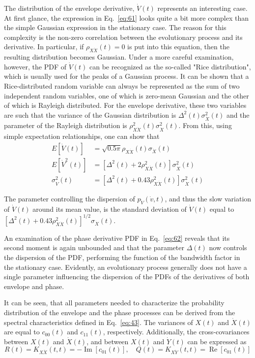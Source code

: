 \documentclass[12pt]{article}
\begin{document}
The distribution of the envelope derivative, $\dot{V}(t)$ represents an interesting case. At first glance, the expression in Eq.~\eqref{eq:61} looks quite a bit more complex than the simple Gaussian expression in the stationary case. The reason for this complexity is the non-zero correlation between the evolutionary process and its derivative. In particular, if $\rho_{X \dot{X}}(t)=0$ is put into this equation, then the resulting distribution becomes Gaussian. Under a more careful examination, however, the PDF of $\dot{V}(t)$ can be recognized as the so-called "Rice distribution", which is usually used for the peaks of a Gaussian process. It can be shown that a Rice-distributed random variable can always be represented as the sum of two independent random variables, one of which is zero-mean Gaussian and the other of which is Rayleigh distributed. For the envelope derivative, these two variables are such that the variance of the Gaussian distribution is $\Delta^{2}(t) \sigma_{\dot{X}}^{2}(t)$ and the parameter of the Rayleigh distribution is $\rho_{X \dot{X}}^{2}(t) \sigma_{\dot{X}}^{2}(t)$. From this, using simple expectation relationships, one can show that
\begin{align}
E[\dot{V}(t)] &=\sqrt{0.5 \pi} \rho_{X \dot{X}}(t) \sigma_{\dot{X}}(t) \nonumber \\
E\left[\dot{V}^{2}(t)\right] &=\left[\Delta^{2}(t)+2 \rho_{X \dot{X}}^{2}(t)\right] \sigma_{\dot{X}}^{2}(t) \nonumber \\
\sigma_{\dot{V}}^{2}(t) &=\left[\Delta^{2}(t)+0.43 \rho_{X \dot{X}}^{2}(t)\right] \sigma_{\dot{X}}^{2}(t)
\label{eq:65}
\end{align}

The parameter controlling the dispersion of $p_{\dot{V}}(\dot{v}, t)$, and thus the slow variation of $\dot{V}(t)$ around its mean value, is the standard deviation of $\dot{V}(t)$ equal to $\left[\Delta^{2}(t)+0.43 \rho_{X \dot{X}}^{2}(t)\right]^{1/2} \sigma_{\dot{X}}(t)$.

An examination of the phase derivative PDF in Eq.~\eqref{eq:62} reveals that its second moment is again unbounded and that the parameter $\Delta(t)$ now controls the dispersion of the PDF, performing the function of the bandwidth factor in the stationary case. Evidently, an evolutionary process generally does not have a single parameter influencing the dispersion of the PDFs of the derivatives of both envelope and phase.

It can be seen, that all parameters needed to characterize the probability distribution of the envelope and the phase processes can be derived from the spectral characteristics defined in Eq.~\eqref{eq:43}. The variances of $X(t)$ and $\dot{X}(t)$ are equal to $c_{00}(t)$ and $c_{11}(t)$, respectively. Additionally, the cross-covariances between $X(t)$ and $\dot{X}(t)$, and between $X(t)$ and $\dot{Y}(t)$ can be expressed as
\begin{equation}
R(t)=K_{X \dot{X}}(t, t)=-\operatorname{Im}\left[c_{01}(t)\right], \quad Q(t)=K_{X \dot{Y}}(t, t)=\operatorname{Re}\left[c_{01}(t)\right]
\label{eq:66}
\end{equation}
\end{document}
